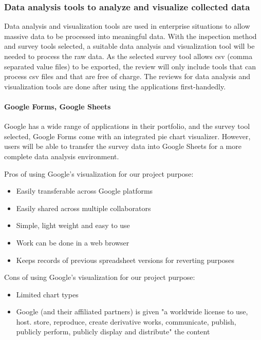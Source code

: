 \newpage

\subsubsection{Data analysis tools to analyze and visualize collected data}
Data analysis and visualization tools are used in enterprise situations to allow massive data to be processed into meaningful data.
With the inspection method and survey tools selected, a suitable data analysis and visualization tool will be needed to process the raw data.
As the selected survey tool allows csv (comma separated value files) to be exported, the review will only include tools that can process csv files and that are free of charge.
The reviews for data analysis and visualization tools are done after using the applications first-handedly. 

\paragraph{Google Forms, Google Sheets}
Google has a wide range of applications in their portfolio, and the survey tool selected, Google Forms come with an integrated pie chart visualizer.
However, users will be able to transfer the survey data into Google Sheets for a more complete data analysis environment.

Pros of using Google's visualization for our project purpose:
\begin{itemize}
\item Easily transferable across Google platforms
\item Easily shared across multiple collaborators
\item Simple, light weight and easy to use
\item Work can be done in a web browser
\item Keeps records of previous spreadsheet versions for reverting purposes
\end{itemize}

Cons of using Google's visualization for our project purpose:
\begin{itemize}
\item Limited chart types
\item Google (and their affiliated partners) is given "a worldwide license to use, host. store, reproduce, create derivative works, communicate, publish, publicly perform, publicly display and distribute" the content \cite{google}
\end{itemize}

